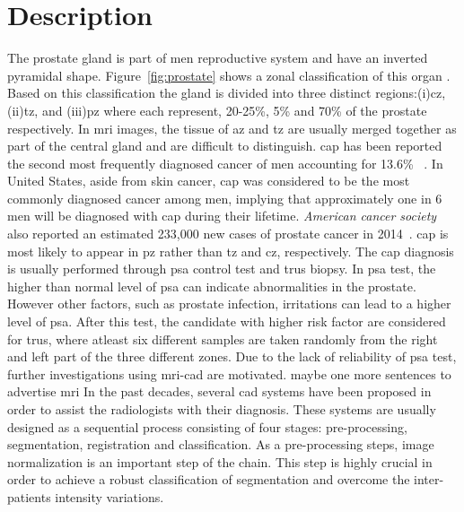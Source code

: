 \graphicspath{ {./content/intro/figures/} }

\section{Description}
\label{sec:descr}  %
The prostate gland is part of men reproductive system and have an inverted pyramidal shape. 
Figure~\ref{fig:prostate} shows a zonal classification of this organ \cite{mcneal1981zonal}. 
Based on this classification the gland is divided into three distinct regions:(i)\ac{cz}, (ii)\ac{tz}, and (iii)\ac{pz} where each represent, 20-25\%, 5\% and 70\% of the prostate respectively. 
In \ac{mri} images, the tissue of \ac{az} and \ac{tz} are usually merged together as part of the central gland and are difficult to distinguish. 
\ac{cap} has been reported the second most frequently diagnosed cancer of men accounting for 13.6\% ~\cite{ferlay2010estimates}. 
In United States, aside from skin cancer, \ac{cap} was considered to be the most commonly diagnosed cancer among men, implying that approximately one in 6 men will be diagnosed with \ac{cap} during their lifetime. 
\textit{American cancer society} also reported an estimated 233,000 new cases of prostate cancer in 2014~\cite{CancerFactsFigures2014}. 
\Ac{cap} is most likely to appear in \ac{pz} rather than \ac{tz} and \ac{cz}, respectively. 
The \ac{cap} diagnosis is usually performed through \ac{psa} control test and \ac{trus} biopsy.
In \Ac{psa} test, the higher than normal level of \ac{psa} can indicate abnormalities in the prostate. 
However other factors, such as prostate infection, irritations can lead to a higher level of \ac{psa}.
After this test, the candidate with higher risk factor are considered for \ac{trus}, where atleast six different samples are taken randomly from the right and left part of the three different zones. 
Due to the lack of reliability of \ac{psa} test, further investigations using \ac{mri}-\ac{cad} are motivated. 
{\color{red}maybe one more sentences to advertise \ac{mri}}
In the past decades, several \ac{cad} systems have been proposed in order to assist the radiologists with their diagnosis. These systems are usually designed as a sequential process consisting of four stages: pre-processing, segmentation, registration and classification.
As a pre-processing steps, image normalization is an important step of the chain. 
This step is highly crucial in order to achieve a robust classification of segmentation and overcome the inter-patients intensity variations.
